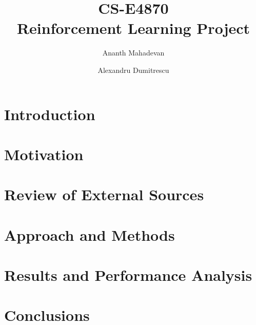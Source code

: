 \documentclass[article]{article}
\title{CS-E4870 \\
        \large Reinforcement Learning Project}
\author{  Ananth Mahadevan\\
\and
Alexandru Dumitrescu\\
}
\date{}
\begin{document}
\maketitle


\section{Introduction}
\label{sec:introduction}

\section{Motivation}
\label{sec:motivation}


\section{Review of External Sources}
\label{sec:external}

\section{Approach and Methods}
\label{sec:methods}

\section{Results and Performance Analysis}
\label{sec:results}

\section{Conclusions}
\label{sec:conclusion}
\end{document}
